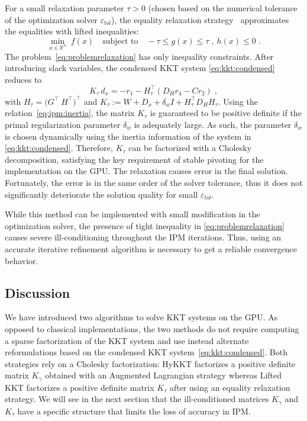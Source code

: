 For a small relaxation parameter $\tau > 0$ (chosen based on the numerical tolerance of the optimization solver
$\varepsilon_{tol}$), the equality relaxation strategy~\cite{shin2023accelerating} approximates
the equalities with lifted inequalities:
\begin{equation}
  \label{eq:problemrelaxation}
    \min_{x \in \mathbb{R}^n} \;  f(x)
\quad \text{subject to}\quad
     - \tau \leq g(x) \leq \tau \;,~  h(x) \leq 0  \; .
\end{equation}
The problem~\eqref{eq:problemrelaxation} has only inequality constraints.
After introducing slack variables, the condensed KKT system \eqref{eq:kkt:condensed} reduces to
\begin{equation}
  \label{eq:liftedkkt}
    K_\tau \,d_x = - r_1 - H_\tau^\top(D_H r_4 - C r_2) \; ,
\end{equation}
with $H_\tau = \big(G^\top ~ H^\top \big)^\top$ and
$K_\tau := W + D_x + \delta_w I + H_\tau^\top D_H H_\tau$.
Using the relation~\eqref{eq:ipm:inertia}, the matrix $K_\tau$
is guaranteed to be positive definite if the primal regularization parameter $\delta_w$ is adequately large.
As such, the parameter $\delta_w$ is chosen dynamically using the inertia information of the system in \eqref{eq:kkt:condensed}.
Therefore, $K_\tau$ can be factorized with a Cholesky decomposition, satisfying the key requirement of stable pivoting for the implementation on the GPU. The relaxation causes error in the final solution.
Fortunately, the error is in the same order of the solver tolerance, thus it does not significantly deteriorate the solution quality for small $\varepsilon_{tol}$.

While this method can be implemented with small modification in the optimization solver, the presence of tight inequality in \eqref{eq:problemrelaxation} causes severe ill-conditioning throughout the IPM iterations. Thus,
using an accurate iterative refinement algorithm is necessary to get a reliable convergence behavior.

\subsection{Discussion}
We have introduced two algorithms to solve
KKT systems on the GPU. As opposed to classical implementations,
the two methods do not require computing a sparse \lblt factorization of the KKT
system and use instead alternate reformulations based on the condensed KKT
system~\eqref{eq:kkt:condensed}. Both strategies
rely on a Cholesky factorization: HyKKT factorizes a positive
definite matrix $K_\gamma$ obtained with an Augmented Lagrangian strategy
whereas Lifted KKT factorizes a positive definite matrix $K_\tau$
after using an equality relaxation strategy.
We will see in the next section that the ill-conditioned matrices $K_\gamma$ and $K_\tau$
have a specific structure that limits the loss of accuracy in IPM.


